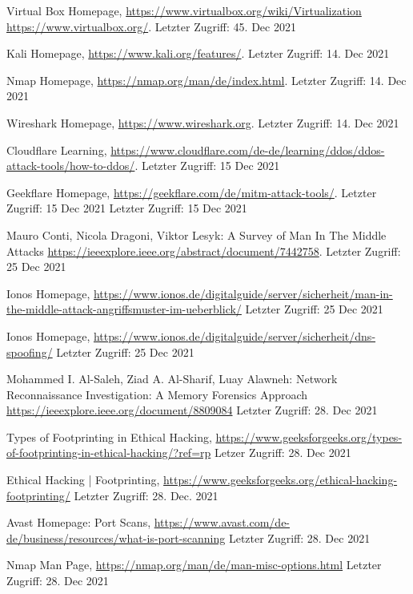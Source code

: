 \begin{thebibliography}{8}
Virtual Box Homepage, \url{https://www.virtualbox.org/wiki/Virtualization} \url{https://www.virtualbox.org/}. Letzter Zugriff: 45. Dec 2021

Kali Homepage, \url{https://www.kali.org/features/}. Letzter Zugriff: 14. Dec 2021

Nmap Homepage, \url{https://nmap.org/man/de/index.html}. Letzter Zugriff: 14. Dec 2021

Wireshark Homepage, \url{https://www.wireshark.org}. Letzter Zugriff: 14. Dec 2021

Cloudflare Learning, \url{ https://www.cloudflare.com/de-de/learning/ddos/ddos-attack-tools/how-to-ddos/}. Letzter Zugriff: 15 Dec 2021

Geekflare Homepage, \url{https://geekflare.com/de/mitm-attack-tools/}. Letzter Zugriff: 15 Dec 2021 Letzter Zugriff: 15 Dec 2021

Mauro Conti, Nicola Dragoni, Viktor Lesyk: A Survey of Man In The Middle Attacks \url{https://ieeexplore.ieee.org/abstract/document/7442758}. Letzter Zugriff: 25 Dec 2021

Ionos Homepage, \url{https://www.ionos.de/digitalguide/server/sicherheit/man-in-the-middle-attack-angriffsmuster-im-ueberblick/} Letzter Zugriff: 25 Dec 2021

Ionos Homepage, \url{https://www.ionos.de/digitalguide/server/sicherheit/dns-spoofing/} Letzter Zugriff: 25 Dec 2021

Mohammed I. Al-Saleh, Ziad A. Al-Sharif,  Luay Alawneh: Network Reconnaissance Investigation: A Memory Forensics Approach \url{https://ieeexplore.ieee.org/document/8809084} Letzter Zugriff: 28. Dec 2021

Types of Footprinting in Ethical Hacking, \url{https://www.geeksforgeeks.org/types-of-footprinting-in-ethical-hacking/?ref=rp} Letzer Zugriff: 28. Dec 2021

Ethical Hacking | Footprinting, \url{https://www.geeksforgeeks.org/ethical-hacking-footprinting/} Letzter Zugriff: 28. Dec. 2021

Avast Homepage: Port Scans, \url{https://www.avast.com/de-de/business/resources/what-is-port-scanning} Letzter Zugriff: 28. Dec 2021

Nmap Man Page, \url{https://nmap.org/man/de/man-misc-options.html} Letzter Zugriff: 28. Dec 2021


\end{thebibliography}
